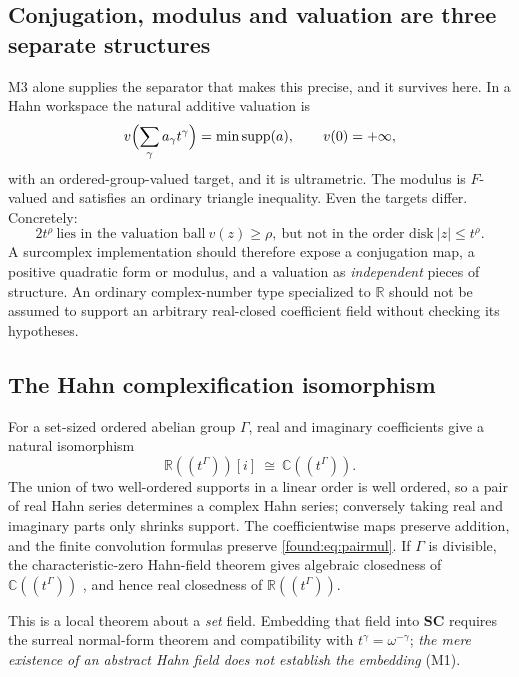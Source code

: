 \documentclass[11pt,letterpaper]{article}
\numberwithin{equation}{section}
\theoremstyle{definition}
\theoremstyle{remark}
\newcommand{\SC}{\mathbf{SC}}
\newcommand{\R}{\mathbb R}
\newcommand{\C}{\mathbb C}
\newcommand{\supp}{\operatorname{supp}}
\begin{document}
\subsection{Conjugation, modulus and valuation are three separate structures}
\label{found:sub:valuation}
M3 alone supplies the separator that makes this precise, and it survives here.
In a Hahn workspace the natural additive valuation is
\[
 v\Bigl(\sum_\gamma a_\gamma t^\gamma\Bigr)=\min\supp(a),\qquad v(0)=+\infty,
\]
with an ordered-group-valued target, and it is ultrametric. The modulus is
$F$-valued and satisfies an ordinary triangle inequality. Even the targets
differ. Concretely:
\begin{equation}\label{found:eq:separator}
 2t^\rho\ \text{lies in the valuation ball}\ v(z)\ge\rho,
 \ \text{but not in the order disk}\ |z|\le t^\rho.
\end{equation}
A surcomplex implementation should therefore expose a conjugation map, a
positive quadratic form or modulus, and a valuation as \emph{independent} pieces
of structure. An ordinary complex-number type specialized to $\R$ should not be
assumed to support an arbitrary real-closed coefficient field without checking
its hypotheses.

\subsection{The Hahn complexification isomorphism}
\label{found:sub:hahncomplex}
For a set-sized ordered abelian group $\Gamma$, real and imaginary coefficients
give a natural isomorphism
\begin{equation}\label{found:eq:hahncomplex}
 \R((t^\Gamma))[i]\ \cong\ \C((t^\Gamma)).
\end{equation}
The union of two well-ordered supports in a linear order is well ordered, so a
pair of real Hahn series determines a complex Hahn series; conversely taking
real and imaginary parts only shrinks support. The coefficientwise maps preserve
addition, and the finite convolution formulas preserve
\eqref{found:eq:pairmul}. If $\Gamma$ is divisible, the characteristic-zero
Hahn-field theorem gives algebraic closedness of $\C((t^\Gamma))$
\cite{found:Poonen}, and hence real closedness of $\R((t^\Gamma))$.

This is a local theorem about a \emph{set} field. Embedding that field into
$\SC$ requires the surreal normal-form theorem and compatibility with
$t^\gamma=\omega^{-\gamma}$; \emph{the mere existence of an abstract Hahn field
does not establish the embedding} (M1).
\end{document}

